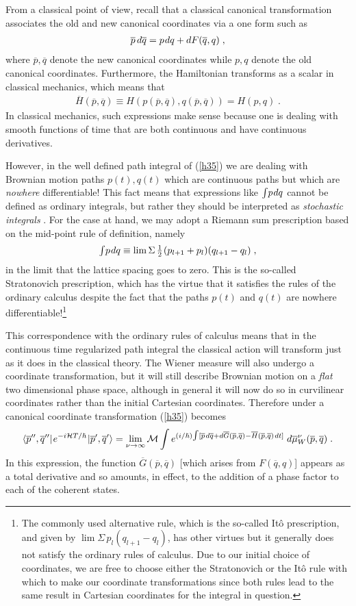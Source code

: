 \documentclass[12pt]{article}
\def\half{\textstyle{\frac{1}{2}}}
\def\H{{\cal H}}
\def\ra{\rightarrow}
\def\tint{{\textstyle\int}}
\def\s{\hskip.08em}
\def\o{\overline}
\def\bn{\begin{eqnarray}}     %
\def\en{\end{eqnarray}}       %
\def\<{\langle}
\def\>{\rangle}
\begin{document}
{}From a classical point of view, recall that a classical canonical 
transformation associates the old and new canonical coordinates via a 
one form such as
  \bn  {\o p}\,d{\o q}=p\s dq+dF({\o q},q)\;,  \en
where ${\o p},{\o q}$ denote the new canonical coordinates while $p,q$ 
denote the old canonical coordinates. Furthermore, the Hamiltonian 
transforms as a scalar in classical mechanics, which means that
  \bn  {\o H}({\o p},{\o q})\equiv H(p({\o p},{\o q}),q({\o p},{\o q}))=
H(p,q)\;. \en
In classical mechanics, such expressions make sense because one is dealing 
with smooth functions of time that are both continuous and have continuous 
derivatives. 

However, in the well defined path integral of (\ref{h35}) we are dealing 
with Brownian motion paths $p(t),q(t)$ which are continuous paths but 
which are {\it nowhere} differentiable! This fact means that expressions 
like $\tint p\s dq$ cannot be defined as ordinary integrals, but rather 
they should be interpreted as {\it stochastic integrals} \cite{jjj}. For 
the case at hand, we may adopt a Riemann sum prescription based on the 
mid-point rule of definition, namely
  \bn \tint p\s dq\equiv \lim\Sigma\,\half\s(p_{l+1}+p_l)(q_{l+1}-q_l) 
\;,  \en
in the limit that the lattice spacing goes to zero. This is the so-called 
Stratonovich prescription, which has the virtue that it satisfies the 
rules of the ordinary calculus \cite{jjj} despite the fact that the 
paths $p(t)$ and $q(t)$ are nowhere differentiable!\footnote{The 
commonly used alternative rule, which is the so-called It\^o prescription, 
and given by $\lim\Sigma\, p_l(q_{l+1}-q_l)$, has other virtues but it 
generally does not satisfy the ordinary rules of calculus. Due to our 
initial choice of coordinates, we are free to choose either the 
Stratonovich or the It\^o rule with which to make our coordinate 
transformations since both rules lead to the same result in Cartesian 
coordinates for the integral in question.} 

This correspondence with the ordinary rules of calculus means that in 
the continuous time regularized path integral the classical action will 
transform just as it does in the classical theory. The Wiener measure 
will also undergo a coordinate transformation, but it will still 
describe Brownian motion on a {\it flat} two dimensional phase space, 
although in general it will now do so in curvilinear coordinates rather 
than the initial Cartesian coordinates. Therefore under a canonical 
coordinate transformation
(\ref{h35}) becomes \cite{dau,kla32}
  \bn \<{\o p}'',{\o q}''|\s e^{-i\H T/\hbar}\s|{\o p}',{\o q}'\>=
\lim_{\nu\ra\infty}{\cal M}\int e^{(i/\hbar)\tint[{\o p}\s d{\o q}+
d{\o G}({\o p},{\o q})-{\o H}({\o p},{\o q})\s dt]}\;
d{\o\mu}^\nu_W({\o p},{\o q})\;. \en
In this expression, the function ${\o G}({\o p},{\o q})$ [which arises 
from $F({\o q},q)$] appears as a total derivative and so amounts, in 
effect, to the addition of a phase factor to each of the coherent states. 
\end{document}
